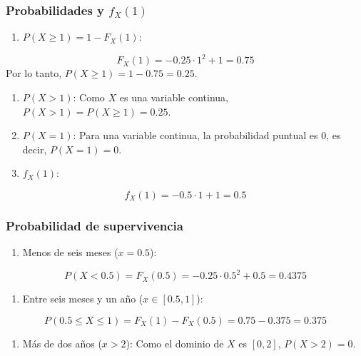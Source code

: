 \documentclass[
]{article}
\providecommand{\tightlist}{%
  \setlength{\itemsep}{0pt}\setlength{\parskip}{0pt}}
\begin{document}
\subsubsection{\texorpdfstring{Probabilidades y \(f_X(1)\)}{Probabilidades y f\_X(1)}}\label{probabilidades-y-f_x1}

\begin{enumerate}
\def\labelenumi{\arabic{enumi}.}
\tightlist
\item
  \(P(X \geq 1) = 1 - F_X(1)\):
\end{enumerate}

\[
F_X(1) = -0.25 \cdot 1^2 + 1 = 0.75
\]
Por lo tanto, \(P(X \geq 1) = 1 - 0.75 = 0.25\).

\begin{enumerate}
\def\labelenumi{\arabic{enumi}.}
\setcounter{enumi}{1}
\item
  \(P(X > 1)\): Como \(X\) es una variable continua, \(P(X > 1) = P(X \geq 1) = 0.25\).
\item
  \(P(X = 1)\): Para una variable continua, la probabilidad puntual es 0, es decir, \(P(X = 1) = 0\).
\item
  \(f_X(1)\):
\end{enumerate}

\[
f_X(1) = -0.5 \cdot 1 + 1 = 0.5
\]

\subsubsection{Probabilidad de supervivencia}\label{probabilidad-de-supervivencia}

\begin{enumerate}
\def\labelenumi{\arabic{enumi}.}
\tightlist
\item
  Menos de seis meses (\(x = 0.5\)):
\end{enumerate}

\[
P(X < 0.5) = F_X(0.5) = -0.25 \cdot 0.5^2 + 0.5 = 0.4375
\]

\begin{enumerate}
\def\labelenumi{\arabic{enumi}.}
\setcounter{enumi}{1}
\tightlist
\item
  Entre seis meses y un año (\(x \in [0.5, 1]\)):
\end{enumerate}

\[
P(0.5 \leq X \leq 1) = F_X(1) - F_X(0.5) = 0.75 - 0.375 = 0.375
\]

\begin{enumerate}
\def\labelenumi{\arabic{enumi}.}
\setcounter{enumi}{2}
\tightlist
\item
  Más de dos años (\(x > 2\)): Como el dominio de \(X\) es \([0, 2]\), \(P(X > 2) = 0\).
\end{enumerate}
\end{document}
